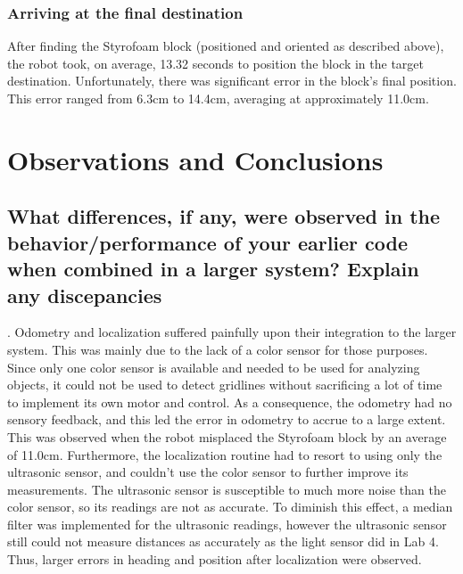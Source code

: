 \documentclass[10pt]{article}
\begin{document}
\subsubsection{Arriving at the final destination}
After finding the Styrofoam block (positioned and oriented as described above), the robot took, on
average, 13.32 seconds to position the block in the target destination. Unfortunately, there was
significant error in the block's final position. This error ranged from 6.3cm to 14.4cm, averaging
at approximately 11.0cm.

\section{Observations and Conclusions}
\subsection{What differences, if any, were observed in the behavior/performance of your earlier code
when combined in a larger system? Explain any discepancies}.
Odometry and localization suffered painfully upon their integration to the larger system. This was
mainly due to the lack of a color sensor for those purposes. Since only one color sensor is
available and needed to be used for analyzing objects, it could not be used to detect gridlines
without sacrificing a lot of time to implement its own motor and control. As a consequence, the
odometry had no sensory feedback, and this led the error in odometry to accrue to a large extent.
This was observed when the robot misplaced the Styrofoam block by an average of 11.0cm. Furthermore,
the localization routine had to resort to using only the ultrasonic sensor, and couldn't use the
color sensor to further improve its measurements. The ultrasonic sensor is susceptible to much more
noise than the color sensor, so its readings are not as accurate. To diminish this effect, a median
filter was implemented for the ultrasonic readings, however the ultrasonic sensor still could not
measure distances as accurately as the light sensor did in Lab 4. Thus, larger errors in heading and
position after localization were observed.
\end{document}
